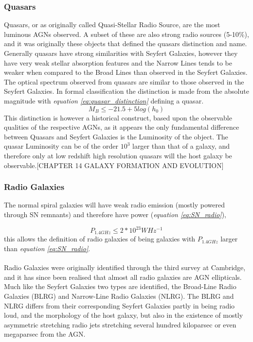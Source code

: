 \documentclass[11pt]{article}
\begin{document}
\subsubsection{Quasars}
Quasars, or as originally called Quasi-Stellar Radio Source, are the most luminous AGNs observed. A subset of these are also strong radio sources (5-10\%), and it was originally these objects that defined the quasars distinction and name. Generally quasars have strong similarities with Seyfert Galaxies, however they have very weak stellar absorption features and the Narrow Lines tends to be weaker when compared to the Broad Lines than observed in the Seyfert Galaxies. The optical spectrum observed from quasars are similar to those observed in the Seyfert Galaxies. In formal classification the distinction is made from the absolute magnitude with \emph{equation \ref{eq:quasar_distinction}} defining a quasar.
\begin{equation}
M_{B} \le -21.5 + 5log(h_{0}) 
\label{eq:quasar_distinction}
\end{equation}
This distinction is however a historical construct, based upon the observable qualities of the respective AGNs, as it appears the only fundamental difference between Quasars and Seyfert Galaxies is the Luminosity of the object. The quasar Luminosity can be of the order $10^3$ larger than that of a galaxy, and therefore only at low redshift high resolution quasars will the host galaxy be observable.[CHAPTER 14 GALAXY FORMATION AND EVOLUTION]

\subsubsection{Radio Galaxies}
The normal spiral galaxies will have weak radio emission (mostly powered through SN remnants) and therefore have power (\emph{equation \ref{eq:SN_radio}}),

\begin{equation}
P_{1.4GHz} \le 2*10^{23} WHz^{-1}
\label{eq:SN_radio}
\end{equation}
this allows the definition of radio galaxies of being galaxies with $P_{1.4GHz}$ larger than \emph{equation \ref{eq:SN_radio}}. \\
\\
Radio Galaxies were originally identified through the third survey at Cambridge, and it has since been realised that almost all radio galaxies are AGN ellipticals. Much like the Seyfert Galaxies two types are identified, the Broad-Line Radio Galaxies (BLRG) and Narrow-Line Radio Galaxies (NLRG). The BLRG and NLRG differs from their corresponding Seyfert Galaxies partly in being radio loud, and the morphology of the host galaxy, but also in the existence of mostly asymmetric stretching radio jets stretching several hundred kiloparsec or even megaparsec from the AGN. \\
\end{document}
